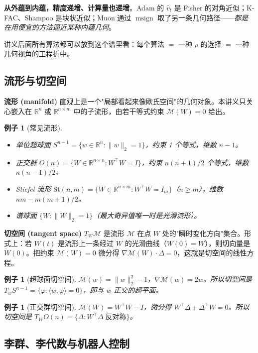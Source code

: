 \documentclass[11pt,a4paper]{article}
\theoremstyle{mythm}
\theoremstyle{mydef}
\newtheorem{example}[theorem]{例子}
\newcommand{\R}{\mathbb{R}}
\newcommand{\msign}{\operatorname{msign}}
\newcommand{\inner}[2]{\langle #1, #2 \rangle}
\begin{document}
\textbf{从外蕴到内蕴，精度递增、计算量也递增}。Adam 的 $\hat v_t$ 是 Fisher 的对角近似；K-FAC、Shampoo 是块状近似；Muon 通过 $\msign$ 取了另一条几何路径——\emph{都是在用便宜的方法逼近某种内蕴几何}。

讲义后面所有算法都可以放到这个谱里看：每个算法 $=$ 一种 $\rho$ 的选择 $=$ 一种几何视角的工程折中。

\subsection{流形与切空间}

\textbf{流形 (manifold)} 直观上是一个"局部看起来像欧氏空间"的几何对象。本讲义只关心嵌入在 $\R^n$ 或 $\R^{n\times m}$ 中的子流形，由若干等式约束 $\mathcal{M}(W) = 0$ 给出。

\begin{example}[常见流形]\hfill
\begin{itemize}[leftmargin=2em]
\item 单位超球面 $S^{n-1} = \{w\in\R^n: \|w\|_2 = 1\}$，约束 1 个等式，维数 $n-1$。
\item 正交群 $O(n) = \{W\in\R^{n\times n}: W^\top W = I\}$，约束 $n(n+1)/2$ 个等式，维数 $n(n-1)/2$。
\item Stiefel 流形 $\mathrm{St}(n,m) = \{W\in\R^{n\times m}: W^\top W = I_m\}$（$n\ge m$），维数 $nm - m(m+1)/2$。
\item 谱球面 $\{W: \|W\|_2 = 1\}$（最大奇异值唯一时是光滑流形）。
\end{itemize}
\end{example}

\textbf{切空间 (tangent space)} $T_W \mathcal{M}$ 是流形 $\mathcal{M}$ 在点 $W$ 处的"瞬时变化方向"集合。形式上：若 $W(t)$ 是流形上一条经过 $W$ 的光滑曲线（$W(0)=W$），则切向量是 $\dot W(0)$。把约束 $\mathcal{M}(W)=0$ 微分得 $\nabla\mathcal{M}(W)\cdot \Delta = 0$，这就是切空间的线性方程。

\begin{example}[超球面切空间]
$\mathcal{M}(w) = \|w\|_2^2 - 1$，$\nabla\mathcal{M}(w) = 2w$。所以切空间是 $T_w S^{n-1} = \{\varphi: \inner{w}{\varphi}=0\}$，即与 $w$ 正交的超平面。
\end{example}

\begin{example}[正交群切空间]
$\mathcal{M}(W) = W^\top W - I$，微分得 $W^\top \Delta + \Delta^\top W = 0$。所以切空间是
$T_W O(n) = \{\Delta: W^\top \Delta\;\text{反对称}\}$。
\end{example}

\subsection{李群、李代数与机器人控制}\label{sec:lie}
\end{document}
